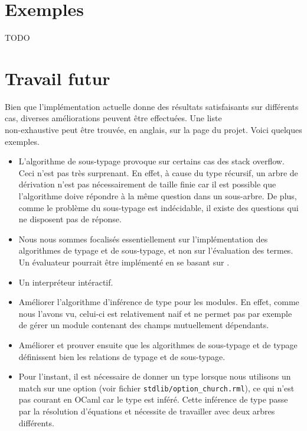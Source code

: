\section{Exemples}

TODO

\section{Travail futur}

Bien que l'implémentation actuelle donne des résultats satisfaisants sur
différents cas, diverses améliorations peuvent être effectuées. Une liste \\
non-exhaustive peut être trouvée, en anglais, sur la page du
projet\cite{rml-github-issues}. Voici quelques exemples.

\begin{itemize}
  \item L'algorithme de sous-typage provoque sur certains cas des stack
    overflow. Ceci n'est pas très surprenant. En effet, à cause
    du type récursif, un arbre de dérivation n'est pas nécessairement de taille finie car
    il est possible que l'algorithme doive répondre à la même question dans un
    sous-arbre. De plus, comme le problème du sous-typage est indécidable, il
    existe des questions qui ne disposent pas de réponse.
  \item Nous nous sommes focalisés essentiellement sur l'implémentation des
    algorithmes de typage et de sous-typage, et non sur l'évaluation des termes.
    Un évaluateur pourrait être implémenté en se basant sur \cite{WF-DOT-2016}.
  \item Un interpréteur intéractif.
  \item Améliorer l'algorithme d'inférence de type pour les modules. En effet,
      comme nous l'avons vu, celui-ci est relativement naif et ne permet pas par
      exemple de gérer un module contenant des champs mutuellement dépendants.
  \item Améliorer et prouver ensuite que les algorithmes de sous-typage et de
      typage définissent bien les relations de typage et de sous-typage.
  \item Pour l'instant, il est nécessaire de donner un type lorsque nous
    utilisons un match sur une option (voir fichier \verb|stdlib/option_church.rml|), ce qui
    n'est pas courant en OCaml car le type est inféré. Cette inférence de type
    passe par la résolution d'équations et nécessite de travailler avec deux
    arbres différents.
\end{itemize}